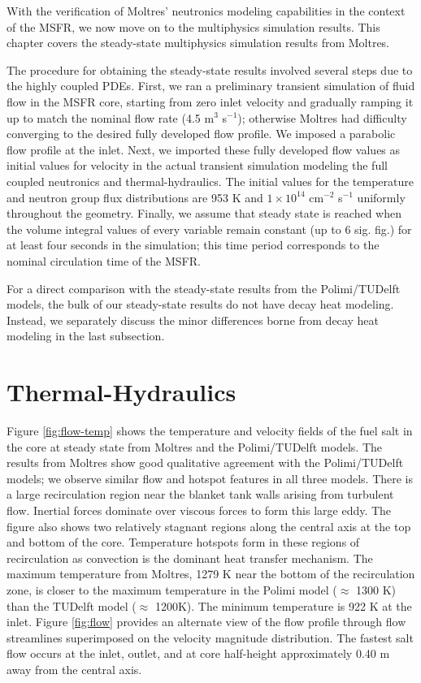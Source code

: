 With the verification of Moltres' neutronics modeling capabilities in the
context of the \gls{MSFR}, we now move on to the multiphysics simulation
results. This chapter covers the steady-state multiphysics simulation results
from Moltres.

The procedure for obtaining the steady-state results involved several steps
due to the highly coupled \glspl{PDE}. First, we ran a preliminary transient
simulation of fluid flow in the \gls{MSFR} core, starting from zero inlet
velocity and gradually ramping it up to match the nominal flow rate (4.5 m$^3$
s$^{-1}$); otherwise Moltres had difficulty converging to the desired fully
developed flow profile. We imposed a parabolic flow profile at the inlet.
Next, we imported these fully developed flow values as initial values for
velocity in the actual transient simulation modeling the full coupled
neutronics and thermal-hydraulics. The initial values for the temperature and
neutron group flux distributions are 953 K and $1 \times 10^{14}$ cm$^{-2}$
s$^{-1}$ uniformly throughout the geometry. Finally, we assume that steady
state is reached when the volume integral values of every variable remain
constant (up to 6 sig. fig.) for at least four seconds in the simulation; this
time period corresponds to the nominal circulation time of the \gls{MSFR}.

For a direct comparison with the steady-state results from the Polimi/TUDelft
models, the bulk of our steady-state results do not have decay heat modeling.
Instead, we separately discuss the minor differences borne from decay heat
modeling in the last subsection.

\section{Thermal-Hydraulics}

Figure \ref{fig:flow-temp} shows the temperature and velocity fields
of the fuel salt in the core at steady state from Moltres and the
Polimi/TUDelft models. The results from Moltres show good qualitative
agreement with the Polimi/TUDelft models; we observe similar flow and hotspot
features in all three models. There is a large recirculation region near the
blanket tank walls arising from turbulent flow. Inertial forces dominate over
viscous forces to form this large eddy. The figure also shows two relatively
stagnant regions along the central axis at the top and bottom of the core.
Temperature hotspots form in these regions of recirculation as convection is
the dominant heat transfer mechanism. The maximum temperature from Moltres,
1279 K near the bottom of the recirculation zone, is closer to the maximum
temperature in the Polimi model ($\approx$ 1300 K) than the TUDelft model
($\approx$ 1200K). The minimum temperature is 922 K at the inlet. Figure
\ref{fig:flow} provides an alternate view of the flow profile through flow
streamlines superimposed on the velocity magnitude distribution. The fastest
salt flow occurs at the inlet, outlet, and at core half-height approximately
0.40 m away from the central axis.

